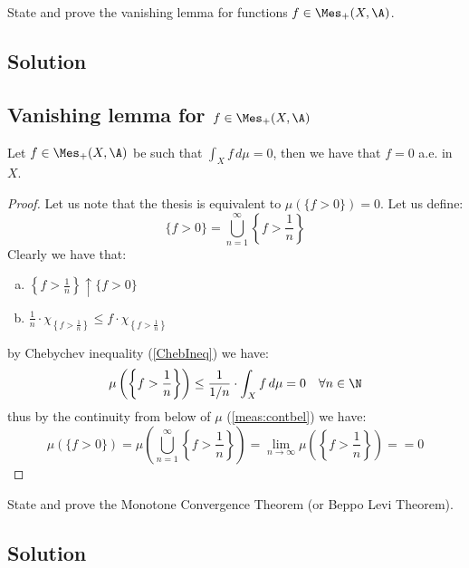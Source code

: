 \sheet 





\question

State and prove the vanishing lemma for functions $f \in \Mes_+(X, \A)$.

\subsection*{Solution}

\subsection{Vanishing lemma for \texorpdfstring{$f \in \Mes_+(X, \A)$}{nonnegative measurable functions}} \label{VanLem}

Let $f \in \Mes_+(X, \A)$ be such that $\int_X f \, d\mu = 0 $, then we have that $f=0$ a.e. in $X$.

\begin{proof}
    Let us note that the thesis is equivalent to $\mu(\{ f > 0\}) = 0$. Let us define:
    \[
        \{ f > 0 \} = \bigcup_{n=1}^\infty \left\{ f > \frac{1}{n} \right\}    
    \]
    Clearly we have that:
    \begin{enumerate}[a)]
        \item $\left\{ f > \frac{1}{n} \right\} \uparrow \{ f > 0 \}$
        \item $\frac{1}{n} \cdot \chi_{\left\{ f > \frac{1}{n} \right\}} \leq f \cdot \chi_{\left\{ f > \frac{1}{n} \right\}}$
    \end{enumerate}
    by Chebychev inequality (\ref{ChebIneq}) we have:
    \[
        \mu \left( \left\{ f > \frac{1}{n} \right\} \right) \leq \frac{1}{1/n} \cdot \int_X f \, d\mu = 0 \quad \forall n\in\N
    \]
    thus by the continuity from below of $\mu$ (\ref{meas:contbel}) we have:
    \[
        \mu(\{ f > 0 \}) = \mu \left( \bigcup_{n=1}^\infty \left\{ f > \frac{1}{n} \right\} \right) = \lim_{n\to\infty} \mu \left( \left\{ f > \frac{1}{n} \right\} \right) = = 0
    \]
\end{proof}


\question

State and prove the Monotone Convergence Theorem (or Beppo Levi Theorem).

\subsection*{Solution}

